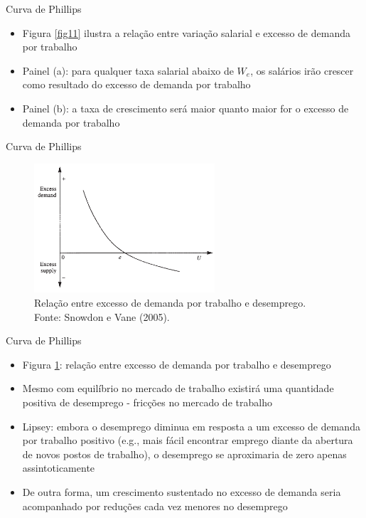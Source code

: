 \documentclass[10pt]{beamer}
\begin{document}
\begin{frame}{Curva de Phillips}
    \begin{itemize}
        \item Figura \ref{fig11} ilustra a relação entre variação salarial e excesso de demanda por trabalho
        \bigskip
        \item Painel (a): para qualquer taxa salarial abaixo de $W_e$, os salários irão crescer como resultado do excesso de demanda por trabalho
        \bigskip
        \item Painel (b): a taxa de crescimento será maior quanto maior for o excesso de demanda por trabalho
    \end{itemize}
\end{frame}

\begin{frame}{Curva de Phillips}
    \begin{figure}
        \centering
        \includegraphics[width=0.6\textwidth]{./figures/aula8_fig4.PNG}
        \caption{Relação entre excesso de demanda por trabalho e desemprego. Fonte: Snowdon e Vane (2005).}
        \label{fig12}
    \end{figure}
\end{frame}

\begin{frame}{Curva de Phillips}
    \begin{itemize}
        \item Figura \ref{fig12}: relação entre excesso de demanda por trabalho e desemprego
        \bigskip
        \item Mesmo com equilíbrio no mercado de trabalho existirá uma quantidade positiva de desemprego - fricções no mercado de trabalho
        \bigskip
        \item Lipsey: embora o desemprego diminua em resposta a um excesso de demanda por trabalho positivo (e.g., mais fácil encontrar emprego diante da abertura de novos postos de trabalho), o desemprego se aproximaria de zero apenas assintoticamente
        \bigskip
        \item De outra forma, um crescimento sustentado no excesso de demanda seria acompanhado por reduções cada vez menores no desemprego
    \end{itemize}
\end{frame}
\end{document}
